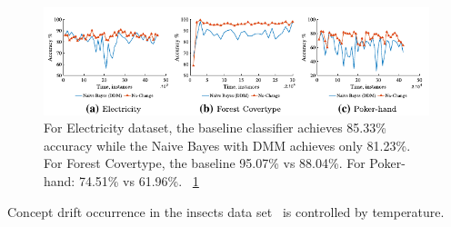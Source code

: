 \documentclass[12 pt]{article}
\begin{document}
  \begin{figure}[htb!]
    \centering
    \includegraphics[height=0.15\textheight]{images_cropped/souza_fig7}
    \caption{
  For Electricity dataset, the baseline classifier achieves 85.33\% accuracy while the Naive Bayes with DMM achieves only 81.23\%. For Forest Covertype, the baseline 95.07\% vs 88.04\%. For Poker-hand: 74.51\% vs 61.96\%.
  ~\ref{fig:fig7_souza}
    }\label{fig:fig7_souza}
  \end{figure}

Concept drift occurrence in the insects data set~\cite{SouzaRMB20} is controlled by temperature.


  
  
\end{document}
